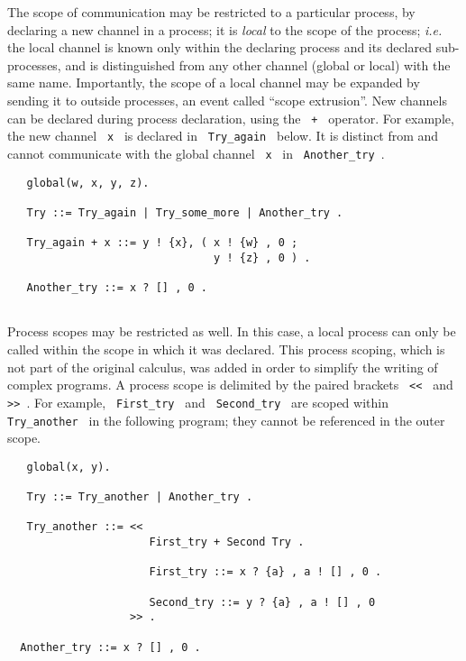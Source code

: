 The scope of communication may be restricted to a particular process,
by declaring a new channel in a process; it is {\em local} to the
scope of the process; {\em i.e.} the local channel is known only
within the declaring process and its declared sub-processes, and is
distinguished from any other channel (global or local) with the same
name.  Importantly, the scope of a local channel may be expanded by
sending it to outside processes, an event called ``scope extrusion''. 
New channels can be declared during process declaration, using the
\verb- + - operator.  For example, the new channel \verb+ x + is
declared in \verb+ Try_again + below. It is distinct from and cannot 
communicate with the global channel \verb+ x + in \verb+ Another_try +.

\begin{verbatim}
   global(w, x, y, z).

   Try ::= Try_again | Try_some_more | Another_try .

   Try_again + x ::= y ! {x}, ( x ! {w} , 0 ;
                                y ! {z} , 0 ) .

   Another_try ::= x ? [] , 0 .
 
\end{verbatim}

Process scopes may be restricted as well. In this case, a local
process can only be called within the scope in which it was
declared. This process scoping, which is not part of the original
calculus, was added in order to simplify the writing of complex
programs.  A process scope is delimited by the paired brackets
\verb+ << + and \verb+ >> +.  For example, \verb+ First_try + and
\verb+ Second_try + are scoped within \verb+ Try_another + in the
following program; they cannot be referenced in the outer scope.

\begin{verbatim}
   global(x, y).

   Try ::= Try_another | Another_try .

   Try_another ::= << 
                      First_try + Second Try .

                      First_try ::= x ? {a} , a ! [] , 0 .

                      Second_try ::= y ? {a} , a ! [] , 0 
                   >> .

  Another_try ::= x ? [] , 0 .
 
\end{verbatim}

\noindent

